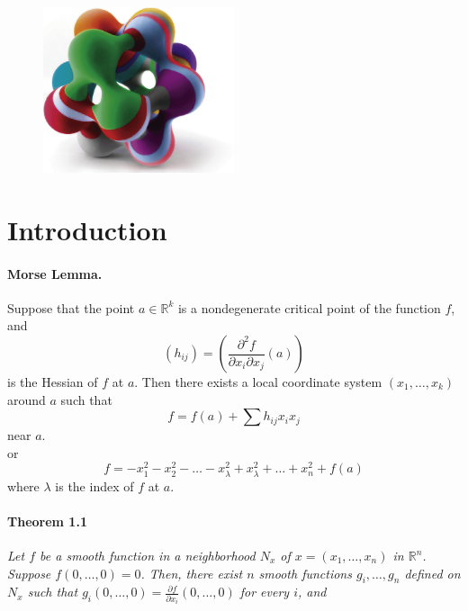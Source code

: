 \documentclass[]{article}
\begin{document}
 
\maketitle

\begin{figure}[h]
    \centering
    \includegraphics[width=0.50\textwidth]{cover}
\end{figure}
 
\tableofcontents
\section{Introduction}
    \paragraph{\textbf{Morse Lemma.}}
        Suppose that the point $a \in \mathbb{R}^k$ is a nondegenerate
        critical point of the function $f$, and
        $$
            (h_{ij})= \left(  \frac{\partial^2f}{\partial x_i \partial x_j} (a) \right)
        $$
        is the Hessian of $f$ at $a$. Then there exists a local coordinate system
        $(x_1,\ldots,x_k)$ around $a$ such that
        $$
            f=f(a)+\sum{h_{ij}x_ix_j}
        $$
        near $a$.
        \\
        or
        $$
            f=-x_1^2-x_2^2-\ldots-x_\lambda^2+x_\lambda^2+\ldots+x_n^2+f(a)
        $$
        where $\lambda$ is the index of $f$ at $a$.

    \paragraph{\textbf{Theorem 1.1}} \textit{ 
        Let $f$ be a smooth function in a neighborhood 
    $N_x$ of $x=(x_1,\ldots,x_n)$ in $\mathbb{R}^n$. Suppose $f(0,\ldots,0)=0$. Then, 
    there exist $n$ smooth functions $g_i,\ldots,g_n$ defined on $N_x$ such that $g_i(0,\ldots,0)=\frac{\partial f}{\partial x_i}(0,\ldots,0)$
    for every $i$, and
    }
\end{document}
